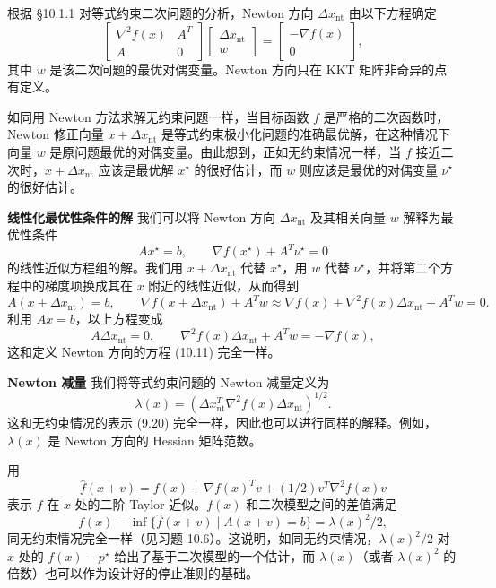 \documentclass[UTF8,12pt,a4paper,fontset=fandol]{ctexart}
\begin{document}
根据 \S10.1.1 对等式约束二次问题的分析，Newton 方向 $\Delta x_{\mathrm{nt}}$ 由以下方程确定
\begin{equation}
\begin{bmatrix}
\nabla^2 f(x) & A^T\\
A & 0
\end{bmatrix}
\begin{bmatrix}
\Delta x_{\mathrm{nt}}\\
w
\end{bmatrix}
=
\begin{bmatrix}
-\nabla f(x)\\
0
\end{bmatrix},
\tag{10.11}
\end{equation}
其中 $w$ 是该二次问题的最优对偶变量。Newton 方向只在 KKT 矩阵非奇异的点有定义。

如同用 Newton 方法求解无约束问题一样，当目标函数 $f$ 是严格的二次函数时，Newton 修正向量 $x+\Delta x_{\mathrm{nt}}$ 是等式约束极小化问题的准确最优解，在这种情况下向量 $w$ 是原问题最优的对偶变量。由此想到，正如无约束情况一样，当 $f$ 接近二次时，$x+\Delta x_{\mathrm{nt}}$ 应该是最优解 $x^\star$ 的很好估计，而 $w$ 则应该是最优的对偶变量 $\nu^\star$ 的很好估计。

\noindent\textbf{线性化最优性条件的解}\quad
我们可以将 Newton 方向 $\Delta x_{\mathrm{nt}}$ 及其相关向量 $w$ 解释为最优性条件
\[
Ax^\star=b,\qquad \nabla f(x^\star)+A^T\nu^\star=0
\]
的线性近似方程组的解。我们用 $x+\Delta x_{\mathrm{nt}}$ 代替 $x^\star$，用 $w$ 代替 $\nu^\star$，并将第二个方程中的梯度项换成其在 $x$ 附近的线性近似，从而得到
\[
A(x+\Delta x_{\mathrm{nt}})=b,\qquad
\nabla f(x+\Delta x_{\mathrm{nt}})+A^Tw\approx
\nabla f(x)+\nabla^2 f(x)\Delta x_{\mathrm{nt}}+A^Tw=0.
\]
利用 $Ax=b$，以上方程变成
\[
A\Delta x_{\mathrm{nt}}=0,\qquad
\nabla^2 f(x)\Delta x_{\mathrm{nt}}+A^Tw=-\nabla f(x),
\]
这和定义 Newton 方向的方程 (10.11) 完全一样。

\noindent\textbf{Newton 减量}\quad
我们将等式约束问题的 Newton 减量定义为
\begin{equation}
\lambda(x)=\left(\Delta x_{\mathrm{nt}}^T\nabla^2 f(x)\Delta x_{\mathrm{nt}}\right)^{1/2}.
\tag{10.12}
\end{equation}
这和无约束情况的表示 (9.20) 完全一样，因此也可以进行同样的解释。例如，$\lambda(x)$ 是 Newton 方向的 Hessian 矩阵范数。

用
\[
\hat{f}(x+v)=f(x)+\nabla f(x)^Tv+(1/2)v^T\nabla^2 f(x)v
\]
表示 $f$ 在 $x$ 处的二阶 Taylor 近似。$f(x)$ 和二次模型之间的差值满足
\begin{equation}
f(x)-\inf\{\hat{f}(x+v)\mid A(x+v)=b\}=\lambda(x)^2/2,
\tag{10.13}
\end{equation}
同无约束情况完全一样（见习题 10.6）。这说明，如同无约束情况，$\lambda(x)^2/2$ 对 $x$ 处的 $f(x)-p^\star$ 给出了基于二次模型的一个估计，而 $\lambda(x)$（或者 $\lambda(x)^2$ 的倍数）也可以作为设计好的停止准则的基础。
\end{document}
